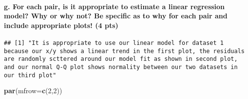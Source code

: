 \documentclass[
]{article}
\newenvironment{Shaded}{\begin{snugshade}}{\end{snugshade}}
\newcommand{\DataTypeTok}[1]{\textcolor[rgb]{0.13,0.29,0.53}{#1}}
\newcommand{\DecValTok}[1]{\textcolor[rgb]{0.00,0.00,0.81}{#1}}
\newcommand{\KeywordTok}[1]{\textcolor[rgb]{0.13,0.29,0.53}{\textbf{#1}}}
\newcommand{\NormalTok}[1]{#1}
\newcommand{\OperatorTok}[1]{\textcolor[rgb]{0.81,0.36,0.00}{\textbf{#1}}}
\newcommand{\StringTok}[1]{\textcolor[rgb]{0.31,0.60,0.02}{#1}}
\begin{document}
\hypertarget{g.-for-each-pair-is-it-appropriate-to-estimate-a-linear-regression-model-why-or-why-not-be-specific-as-to-why-for-each-pair-and-include-appropriate-plots-4-pts}{%
\paragraph{g. For each pair, is it appropriate to estimate a linear
regression model? Why or why not? Be specific as to why for each pair
and include appropriate plots! (4
pts)}\label{g.-for-each-pair-is-it-appropriate-to-estimate-a-linear-regression-model-why-or-why-not-be-specific-as-to-why-for-each-pair-and-include-appropriate-plots-4-pts}}

\begin{Shaded}
\end{Shaded}

\begin{verbatim}
## [1] "It is appropriate to use our linear model for dataset 1 because our x/y shows a linear trend in the first plot, the residuals are randomly scttered around our model fit as shown in second plot, and our normal Q-Q plot shows normality between our two datasets in our third plot"
\end{verbatim}

\begin{Shaded}
\begin{Highlighting}[]
\KeywordTok{par}\NormalTok{(}\DataTypeTok{mfrow=}\KeywordTok{c}\NormalTok{(}\DecValTok{2}\NormalTok{,}\DecValTok{2}\NormalTok{))}
\end{Highlighting}
\end{Shaded}
\end{document}
